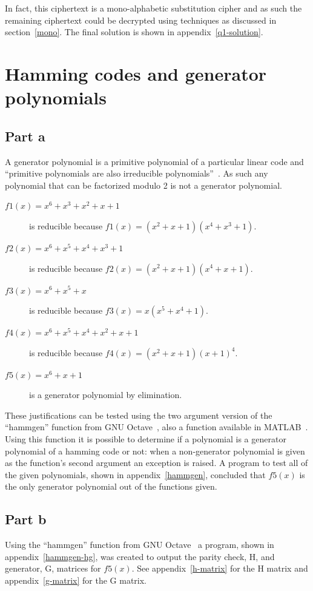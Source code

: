 \documentclass[pdftex, 11pt, a4paper]{article}
\begin{document}
In fact, this ciphertext is a mono-alphabetic substitution cipher and as such the remaining ciphertext could be decrypted using techniques as discussed in section~\ref{mono}.  The final solution is shown in appendix~\ref{q1-solution}.

\section{Hamming codes and generator polynomials}
\subsection{Part a}
A generator polynomial is a primitive polynomial of a particular linear code and ``primitive polynomials are also irreducible polynomials''~\cite{wolfram-primative}.  As such any polynomial that can be factorized modulo 2 is not a generator polynomial.

\begin{description}
    \item[$f1(x) = x^6 + x^3 + x^2 + x + 1$] is reducible because $f1(x) = (x^2+x+1)(x^4+x^3+1)$.
    \item[$f2(x) = x^6 + x^5 + x^4 + x^3 + 1$] is reducible because $f2(x) = (x^2+x+1)(x^4+x+1)$.
    \item[$f3(x) = x^6 + x^5 + x$] is reducible because $f3(x) = x(x^5 + x^4 + 1)$.
    \item[$f4(x) = x^6 + x^5 +x^4 + x^2 +x + 1$] is reducible because $f4(x) = (x^2+x+1)(x+1)^4$.
    \item[$f5(x) = x^6 + x + 1$] is a generator polynomial by elimination.
\end{description}

These justifications can be tested using the two argument version of the ``hammgen'' function from GNU Octave~\cite{hammgen-octave}, also a function available in MATLAB~\cite{hammgen-matlab}. Using this function it is possible to determine if a polynomial is a generator polynomial of a hamming code or not: when a non-generator polynomial is given as the function's second argument an exception is raised.  A program to test all of the given polynomials, shown in appendix~\ref{hammgen}, concluded that $f5(x)$ is the only generator polynomial out of the functions given.

\subsection{Part b}
Using the ``hammgen'' function from GNU Octave~\cite{hammgen-octave} a program, shown in appendix~\ref{hammgen-hg}, was created to output the parity check, H\label{parity-check}, and generator, G, matrices for $f5(x)$. See appendix~\ref{h-matrix} for the H matrix and appendix~\ref{g-matrix} for the G matrix.
\end{document}
